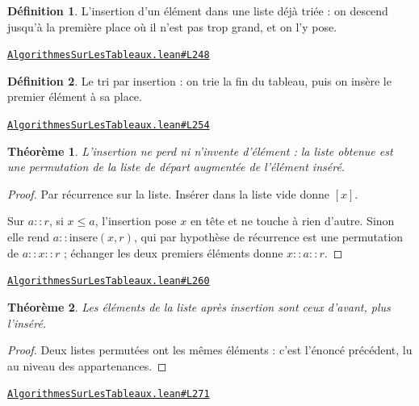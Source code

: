 \documentclass[11pt,a4paper]{article}
\theoremstyle{definition}
\newtheorem{definition}{Définition}
\theoremstyle{plain}
\newtheorem{theoreme}{Théorème}
\newcommand{\source}[2]{\par\smallskip\noindent\hfill{\footnotesize\href{#1}{\texttt{#2}}}\par\smallskip}
\begin{document}
\begin{definition}
L'insertion d'un élément dans une liste déjà triée : on descend jusqu'à la
première place où il n'est pas trop grand, et on l'y pose.
\end{definition}
\source{https://github.com/Commutator-IO/learn-lean/blob/main/courses/02-lycee/11-informatique-nsi/AlgorithmesSurLesTableaux.lean\#L248}{AlgorithmesSurLesTableaux.lean\#L248}

\begin{definition}
Le tri par insertion : on trie la fin du tableau, puis on insère le premier
élément à sa place.
\end{definition}
\source{https://github.com/Commutator-IO/learn-lean/blob/main/courses/02-lycee/11-informatique-nsi/AlgorithmesSurLesTableaux.lean\#L254}{AlgorithmesSurLesTableaux.lean\#L254}

\begin{theoreme}
L'insertion ne perd ni n'invente d'élément : la liste obtenue est une permutation
de la liste de départ augmentée de l'élément inséré.
\end{theoreme}
\begin{proof}
Par récurrence sur la liste. Insérer dans la liste vide donne \([x]\).

Sur \(a :: r\), si \(x \le a\), l'insertion pose \(x\) en tête et ne touche à rien
d'autre. Sinon elle rend \(a :: \mathrm{insere}(x, r)\), qui par hypothèse de
récurrence est une permutation de \(a :: x :: r\) ; échanger les deux premiers éléments
donne \(x :: a :: r\).
\end{proof}
\source{https://github.com/Commutator-IO/learn-lean/blob/main/courses/02-lycee/11-informatique-nsi/AlgorithmesSurLesTableaux.lean\#L260}{AlgorithmesSurLesTableaux.lean\#L260}

\begin{theoreme}
Les éléments de la liste après insertion sont ceux d'avant, plus l'inséré.
\end{theoreme}
\begin{proof}
Deux listes permutées ont les mêmes éléments : c'est l'énoncé précédent, lu au niveau
des appartenances.
\end{proof}
\source{https://github.com/Commutator-IO/learn-lean/blob/main/courses/02-lycee/11-informatique-nsi/AlgorithmesSurLesTableaux.lean\#L271}{AlgorithmesSurLesTableaux.lean\#L271}
\end{document}
